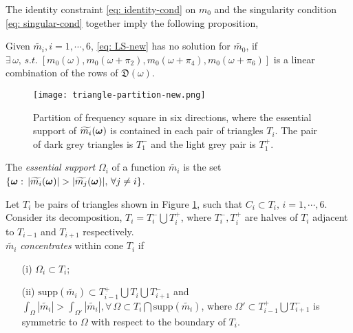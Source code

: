 The identity constraint \eqref{eq: identity-cond} on $m_0$ and the singularity condition \eqref{eq: singular-cond} together imply the following proposition,
\begin{proposition}\label{prop: feasibility}
Given $\widetilde{m_i}, i = 1,\cdots,6$, \eqref{eq: LS-new} has no solution for $\widetilde{m_0}$, if $\exists\,\omega, \,s.t. \; [m_0(\omega), m_0(\omega+\pi_2),m_0(\omega+\pi_4),m_0(\omega+\pi_6)]$ is a linear combination of the rows of $\mathfrak{D}(\omega)$.%
\end{proposition}
\begin{figure}
\centering
\texttt{[image: triangle-partition-new.png]}
\caption{Partition of frequency square in six directions, where the essential support of $\widetilde{m_{i}}(\boldsymbol{\omega})$ is contained in each pair of triangles $T_i$. The pair of dark grey triangles is $T_1^-$ and the light grey pair is $T_1^+$.}
\label{fig: partition 2}
\end{figure}

The {\it essential support} $\Omega_i$ of a function $\widetilde{m_i}$ is the set $\{\V{\omega}:\,|\widetilde{m_i}(\V{\omega})|> |\widetilde{m_j}(\V{\omega})|,\,\forall j\neq i\}$. \vspace{.5em}

Let $T_i$ be pairs of triangles shown in Figure \ref{fig: partition 2}, such that $C_i\subset T_i,\, i = 1,\cdots,6.$ Consider its decomposition, $T_i = T_i^-\bigcup T_i^+$, where $T_i^-, T_i^+$ are halves of $T_i$ adjacent  to $T_{i-1}$ and $T_{i+1}$ respectively.\\[.5em]
  $\widetilde{m_i}$ {\it concentrates} within cone $T_i$ if 
\begin{itemize}
\item[(i)] $\Omega_i\subset T_i$;
\item[(ii)]$\text{supp}(\widetilde{m_i})\subset T_{i-1}^+\bigcup T_i\bigcup T_{i+1}^-$ and $\int_\Omega|\widetilde{m_i}| > \int_{\Omega'}|\widetilde{m_i}|, \forall\, \Omega\subset T_i\bigcap\text{supp}(\widetilde{m_i})$, where $\Omega' \subset T_{i-1}^+\bigcup T_{i+1}^-$ is symmetric to $\Omega$ with respect to the boundary of $T_i$.
\end{itemize}


